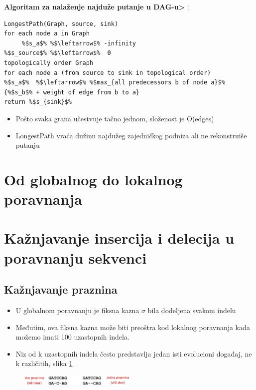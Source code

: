 \textbf{Algoritam za nalaženje najduže putanje u DAG-u>} :

\begin{lstlisting}
LongestPath(Graph, source, sink)
for each node a in Graph
     %$s_a$% %$\leftarrow$% -infinity
%$s_source$% %$\leftarrow$%  0
topologically order Graph
for each node a (from source to sink in topological order)
%$s_a$%  %$\leftarrow$% %$max_{all predecessors b of node a}$% {%$s_b$% + weight of edge from b to a}
return %$s_{sink}$%
\end{lstlisting}


\begin{itemize}
    \item Pošto svaka grana učestvuje tačno jednom, složenost je O(edges)
    \item LongestPath vraća dužinu najdužeg zajedničkog podniza ali ne rekonstruiše putanju
\end{itemize}


\section{Od globalnog do lokalnog poravnanja}



\section{Kažnjavanje insercija i delecija u poravnanju sekvenci}

\subsection{Kažnjavanje praznina}

\begin{itemize}
    \item U globalnom poravnanju je fiksna kazna $\sigma$ bila dodeljena svakom indelu
    \item Međutim, ova fiksna kazna može biti preoštra
kod lokalnog poravnanja kada možemo imati 100 uzastopnih indela.
    \item Niz od k uzastopnih indela često predstavlja jedan isti evolucioni događaj, ne k različitih, slika \ref{slika:kaznjavanje}
\end{itemize}

\begin{figure}[]
\centering
\includegraphics[width=0.5\textwidth]{poglavlja/5/slike/kaznjavanjePraznina.png}
\caption{}
\label{slika:kaznjavanje}
\end{figure}

